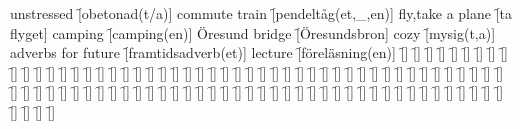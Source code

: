 \begin{questions}
\begin{multicols}{2}
        \question unstressed \f[obetonad(t/a)]
        \question commute train \f[pendeltåg(et,\_,en)]
        \question fly,take a plane \f[ta flyget]
        \question camping \f[camping(en)]
        \question Öresund bridge \f[Öresundsbron]
        \question cozy \f[mysig(t,a)]
        \question adverbs for future \f[framtidsadverb(et)]
        \question lecture \f[föreläsning(en)]
        \question  \f[]
        \question  \f[]
        \question  \f[]
        \question  \f[]
        \question  \f[]
        \question  \f[]
        \question  \f[]
        \question  \f[]
        \question  \f[]
        \question  \f[]
        \question  \f[]
        \question  \f[]
        \question  \f[]
        \question  \f[]
        \question  \f[]
        \question  \f[]
        \question  \f[]
        \question  \f[]
        \question  \f[]
        \question  \f[]
        \question  \f[]
        \question  \f[]
        \question  \f[]
        \question  \f[]
        \question  \f[]
        \question  \f[]
        \question  \f[]
        \question  \f[]
        \question  \f[]
        \question  \f[]
        \question  \f[]
        \question  \f[]
        \question  \f[]
        \question  \f[]
        \question  \f[]
        \question  \f[]
        \question  \f[]
        \question  \f[]
        \question  \f[]
        \question  \f[]
        \question  \f[]
        \question  \f[]
        \question  \f[]
        \question  \f[]
        \question  \f[]
        \question  \f[]
        \question  \f[]
        \question  \f[]
        \question  \f[]
        \question  \f[]
        \question  \f[]
        \question  \f[]
        \question  \f[]
        \question  \f[]
        \question  \f[]
        \question  \f[]
        \question  \f[]
        \question  \f[]
        \question  \f[]
        \question  \f[]
        \question  \f[]
        \question  \f[]
        \question  \f[]
        \question  \f[]
        \question  \f[]
        \question  \f[]
        \question  \f[]
        \question  \f[]
        \question  \f[]
        \question  \f[]
        \question  \f[]
        \question  \f[]
        \question  \f[]
        \question  \f[]
        \question  \f[]
        \question  \f[]
        \question  \f[]
        \question  \f[]
        \question  \f[]
        \question  \f[]
        \question  \f[]
        \question  \f[]
        \question  \f[]
        \question  \f[]
        \question  \f[]
        \question  \f[]
        \question  \f[]
        \question  \f[]
        \question  \f[]
        \question  \f[]
        \question  \f[]
        \question  \f[]
        \question  \f[]

\end{multicols}
\end{questions}
